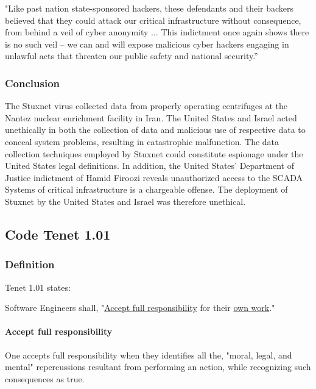\documentclass[12pt]{article}
\begin{document}
\begin{multicols}{2}
\begin{displayquote}
"Like past nation state-sponsored hackers, these defendants and their backers believed that they could attack our critical infrastructure without consequence, from behind a veil of cyber anonymity ... This indictment once again shows there is no such veil – we can and will expose malicious cyber hackers engaging in unlawful acts that threaten our public safety and national security.”\cite{sevenIraniansIndicted}
\end{displayquote}

\subsubsection{Conclusion}

The Stuxnet virus collected data from properly operating centrifuges at the Nantez nuclear enrichment facility in Iran. The United States and Israel acted unethically in both the collection of data and malicious use of respective data to conceal system problems, resulting in catastrophic malfunction. The data collection techniques employed by Stuxnet could constitute espionage under the United States legal definitions. In addition, the United States' Department of Justice indictment of Hamid Firoozi reveals unauthorized access to the SCADA Systems of critical infrastructure is a chargeable offense. The deployment of Stuxnet by the United States and Israel was therefore unethical.


\subsection{Code Tenet 1.01}

\subsubsection{Definition}

Tenet 1.01 states:
\begin{framed}
Software Engineers shall, "\underline{Accept full responsibility} for their \underline{own work}."\cite{softwareEngineeringCodeOfEthics}
\end{framed}

\paragraph{Accept full responsibility}
One accepts full responsibility when they identifies all the, "moral, legal, and mental" repercussions resultant from performing an action, while recognizing such consequences as true.\cite{acceptDefinition}\cite{responsibilityDefinition}


\end{multicols}
\end{document}
